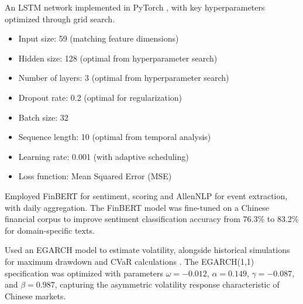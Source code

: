 \documentclass[3p,times,procedia]{elsarticle}
\begin{document}
 An LSTM network implemented in PyTorch \cite{hochreiter1997lstm},
with key hyperparameters optimized through grid search.
\begin{itemize}
    \item Input size: 59 (matching feature dimensions)
\item Hidden size: 128 (optimal from hyperparameter search)
\item Number of layers: 3 (optimal from hyperparameter search)
\item Dropout rate: 0.2 (optimal for regularization)
\item Batch size: 32
\item Sequence length: 10 (optimal from temporal analysis)
\item Learning rate: 0.001 (with adaptive scheduling)
\item Loss function: Mean Squared Error (MSE)
\end{itemize}

 Employed FinBERT \cite{Araci2019} for \allowbreak sentiment, scoring and AllenNLP \cite{Gardner2018} for event extraction, with daily aggregation. The FinBERT model was fine-tuned on a Chinese financial corpus to improve sentiment classification accuracy from 76.3\% to 83.2\% for domain-specific texts.

 Used an EGARCH model \cite{Nelson1991} to estimate volatility, alongside historical simulations for maximum drawdown and CVaR calculations \cite{Rockafellar2000}. The EGARCH(1,1) specification was optimized with parameters $\omega = -0.012$, $\alpha = 0.149$, $\gamma = -0.087$, and $\beta = 0.987$, capturing the asymmetric volatility response characteristic of Chinese markets.
\end{document}
